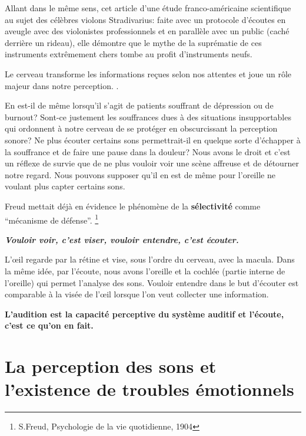 Allant dans le même sens, cet 
article d'une 
étude franco-américaine scientifique
\autocite{fritz_stradivarius} au sujet des célèbres violons
Stradivarius: faite avec un protocole 
d'écoutes en aveugle avec
des violonistes professionnels et en parallèle avec un public (caché
derrière un rideau), elle démontre que le mythe de la suprématie
de ces instruments extrêmement chers tombe au profit d'instruments
neufs.

Le cerveau 
transforme les informations reçues selon nos attentes et joue un
rôle majeur dans notre perception.
\autocite{lemonde.fr:stradivarius}.
% 
\autocite[p. 43]{roque:lecoute}


 
En est-il de même lorsqu'il s'agit de patients souffrant de dépression
ou de burnout? Sont-ce justement les souffrances dues à des situations
insupportables qui
ordonnent à notre cerveau de se protéger en obscurcissant la
perception sonore?  Ne plus écouter certains
sons permettrait-il en quelque sorte d'échapper à la souffrance et de faire une
pause dans la douleur? Nous avons le droit et c'est un réflexe de
survie que de ne plus vouloir voir une scène affreuse et de détourner
notre regard. Nous pouvons supposer qu'il en est de même pour l'oreille ne voulant plus capter
certains sons.

Freud mettait déjà en évidence le phénomène de la
\textbf{sélectivité }comme ``mécanisme de défense''. \footnote{S.Freud,
  Psychologie de la vie quotidienne, 1904}

\textbf{\emph{Vouloir voir, c'est viser, vouloir entendre, c'est
    écouter.}}

L'\oe il regarde par la rétine et  vise, sous l'ordre du
cerveau, avec la macula. Dans la même idée, par l'écoute, nous avons
l'oreille et la cochlée (partie interne de l'oreille) qui permet
l'analyse des sons. Vouloir entendre dans le but d'écouter est comparable  à
la visée de l'\oe il lorsque l'on veut collecter une
information.
 


 \textbf{ L'audition est la capacité perceptive du système auditif et l'écoute, c'est ce qu'on en fait.}


\section{La perception des sons et l'existence de troubles
  émotionnels}



